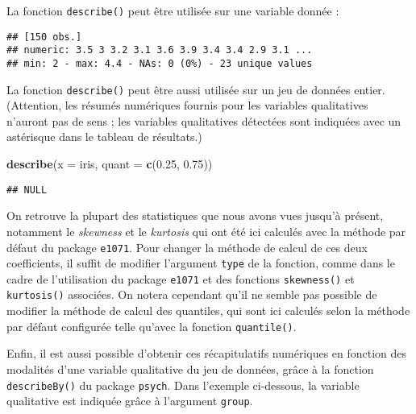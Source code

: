 \documentclass[
  french,
]{book}
\newenvironment{Shaded}{\begin{snugshade}}{\end{snugshade}}
\newcommand{\DataTypeTok}[1]{\textcolor[rgb]{0.13,0.29,0.53}{#1}}
\newcommand{\FloatTok}[1]{\textcolor[rgb]{0.00,0.00,0.81}{#1}}
\newcommand{\KeywordTok}[1]{\textcolor[rgb]{0.13,0.29,0.53}{\textbf{#1}}}
\newcommand{\NormalTok}[1]{#1}
\newcommand{\OperatorTok}[1]{\textcolor[rgb]{0.81,0.36,0.00}{\textbf{#1}}}
\begin{document}
La fonction \texttt{describe()} peut être utilisée sur une variable donnée :

\begin{Shaded}
\end{Shaded}

\begin{verbatim}
## [150 obs.] 
## numeric: 3.5 3 3.2 3.1 3.6 3.9 3.4 3.4 2.9 3.1 ...
## min: 2 - max: 4.4 - NAs: 0 (0%) - 23 unique values
\end{verbatim}

La fonction \texttt{describe()} peut être aussi utilisée sur un jeu de données entier. (Attention, les résumés numériques fournis pour les variables qualitatives n'auront pas de sens ; les variables qualitatives détectées sont indiquées avec un astérisque dans le tableau de résultats.)

\begin{Shaded}
\begin{Highlighting}[]
\KeywordTok{describe}\NormalTok{(}\DataTypeTok{x =}\NormalTok{ iris, }\DataTypeTok{quant =} \KeywordTok{c}\NormalTok{(}\FloatTok{0.25}\NormalTok{, }\FloatTok{0.75}\NormalTok{))}
\end{Highlighting}
\end{Shaded}

\begin{verbatim}
## NULL
\end{verbatim}

On retrouve la plupart des statistiques que nous avons vues jusqu'à présent, notamment le \emph{skewness} et le \emph{kurtosis} qui ont été ici calculés avec la méthode par défaut du package \texttt{e1071}. Pour changer la méthode de calcul de ces deux coefficients, il suffit de modifier l'argument \texttt{type} de la fonction, comme dans le cadre de l'utilisation du package \texttt{e1071} et des fonctions \texttt{skewness()} et \texttt{kurtosis()} associées. On notera cependant qu'il ne semble pas possible de modifier la méthode de calcul des quantiles, qui sont ici calculés selon la méthode par défaut configurée telle qu'avec la fonction \texttt{quantile()}.

Enfin, il est aussi possible d'obtenir ces récapitulatifs numériques en fonction des modalités d'une variable qualitative du jeu de données, grâce à la fonction \texttt{describeBy()} du package \texttt{psych}. Dans l'exemple ci-dessous, la variable qualitative est indiquée grâce à l'argument \texttt{group}.
\end{document}
